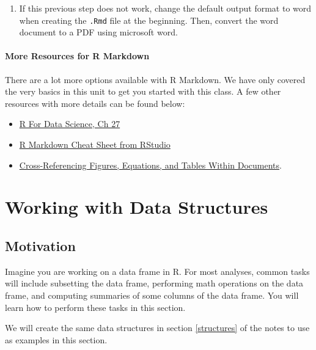 \documentclass[
]{book}
\providecommand{\tightlist}{%
  \setlength{\itemsep}{0pt}\setlength{\parskip}{0pt}}
\theoremstyle{definition}
\theoremstyle{definition}
\theoremstyle{definition}
\theoremstyle{definition}
\theoremstyle{remark}
\begin{document}
\begin{enumerate}
\def\labelenumi{\arabic{enumi}.}
\setcounter{enumi}{1}
\tightlist
\item
  If this previous step does not work, change the default output format to word when creating the \texttt{.Rmd} file at the beginning. Then, convert the word document to a PDF using microsoft word.
\end{enumerate}

\hypertarget{more-resources-for-r-markdown}{%
\subsubsection{More Resources for R Markdown}\label{more-resources-for-r-markdown}}

There are a lot more options available with R Markdown. We have only covered the very basics in this unit to get you started with this class. A few other resources with more details can be found below:

\begin{itemize}
\tightlist
\item
  \href{https://r4ds.had.co.nz/r-markdown.html}{R For Data Science, Ch 27}
\item
  \href{https://rmarkdown.rstudio.com/lesson-15.HTML}{R Markdown Cheat Sheet from RStudio}
\item
  \href{https://pkg.yihui.org/rmarkdown-cookbook/cross-ref}{Cross-Referencing Figures, Equations, and Tables Within Documents}.
\end{itemize}

\hypertarget{subset}{%
\chapter{Working with Data Structures}\label{subset}}

\hypertarget{motivation}{%
\section{Motivation}\label{motivation}}

Imagine you are working on a data frame in R. For most analyses, common tasks will include subsetting the data frame, performing math operations on the data frame, and computing summaries of some columns of the data frame. You will learn how to perform these tasks in this section.

We will create the same data structures in section \ref{structures} of the notes to use as examples in this section.
\end{document}
